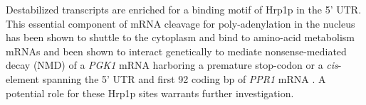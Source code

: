 {%
Destabilized
transcripts are enriched for a binding motif of Hrp1p in
the 5’ UTR. This essential component of mRNA cleavage for
poly-adenylation in the nucleus has been shown to shuttle to the
cytoplasm and bind to amino-acid metabolism mRNAs
\parencite{guisbert2005functional} and been shown to interact genetically to
mediate nonsense-mediated decay (NMD) of a \textit{PGK1} mRNA harboring a
premature stop-codon \parencite{gonzalez2000yeast} or a \textit{cis}-element spanning
the 5’ UTR and first 92 coding bp of \textit{PPR1} mRNA
\parencite{kebaara2003upf}.
A potential role for these Hrp1p sites warrants further investigation. 

}
